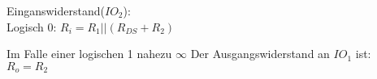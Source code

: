 \begin{frame}[c]{}
  Einganswiderstand($IO_2$):\\
  Logisch 0:
  \begin{math}
    R_i = R_1 || (R_{DS} + R_2)
  \end{math}

  Im Falle einer logischen 1 nahezu $\infty$
  \newline
  \newline
  Der Ausgangswiderstand an $IO_1$ ist:
  \begin{math}
    R_o = R_2
  \end{math}
\end{frame}
